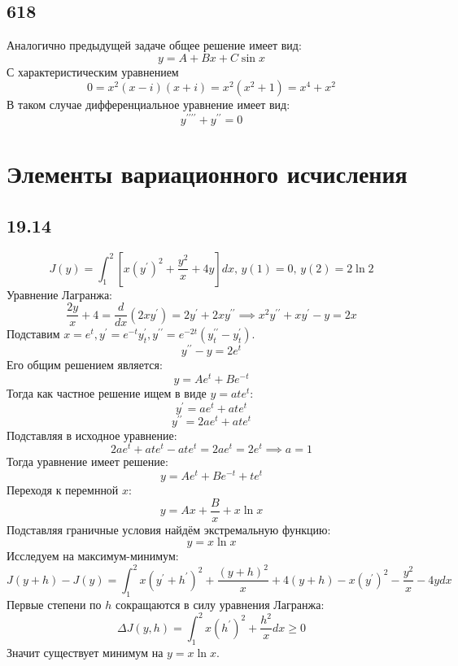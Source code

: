 \documentclass[12pt]{article}
\begin{document}
\subsection*{618}
Аналогично предыдущей задаче общее решение имеет вид: 
\[
    y = A + Bx + C \sin x
\]
С характеристическим уравнением 
\[
    0 = x^2 (x - i) (x + i) = x^2(x^2 + 1) = x^4 + x^2
\]
В таком случае дифференциальное уравнение имеет вид: 
\[
    y^{\prime\prime\prime\prime} + y^{\prime\prime} = 0
\]

\section{Элементы вариационного исчисления}
\subsection*{19.14}
\[
    J(y) = \int_{1}^{2} \left[ x(y^{\prime})^2 + \frac{y^2}{x} + 4y \right] dx, \, y(1) = 0, \, y(2) = 2\ln 2 
\]
Уравнение Лагранжа: 
\[
    \frac{2y}{x} + 4 = \frac{d}{dx} \left( 2x y^{\prime} \right) = 2y^{\prime} + 2x y^{\prime\prime} \implies x^2 y^{\prime\prime} + xy^{\prime} - y = 2x
\]
Подставим $x = e^t, y^{\prime} = e^{-t} y^{\prime}_t, y^{\prime\prime} = e^{-2t} (y^{\prime\prime}_t - y^{\prime}_t)$. 
\[
    y^{\prime\prime} - y = 2e^{t}
\]
Его общим решением является: 
\[
    y = A e^t + B e^{-t}
\]
Тогда как частное решение ищем в виде $y = at e^t$:
\[
    y^{\prime} = ae^t + at e^t 
\] 
\[
    y^{\prime\prime} = 2ae^t + at e^t
\]
Подставляя в исходное уравнение: 
\[
    2ae^t + at e^t - ate^t = 2ae^t = 2 e^t \implies a = 1
\]
Тогда уравнение имеет решение: 
\[
    y = A e^t + B e^{-t} + t e^t
\]
Переходя к перемнной $x$: 
\[
    y = Ax + \frac{B}{x} + x \ln x 
\] 
Подставляя граничные условия найдём экстремальную функцию: 
\[
    y = x \ln x
\]
Исследуем на максимум-минимум: 
\[
    J(y + h) - J(y) = 
    \int_{1}^{2} x (y^{\prime} + h^{\prime} )^2 + \frac{(y + h)^2}{x} + 4(y + h) - x(y^{\prime})^2 - \frac{y^2}{x} - 4y dx
\]
Первые степени по $h$ сокращаются в силу уравнения Лагранжа: 
\[
    \Delta J(y, h) = \int_{1}^{2} x (h^{\prime})^2 + \frac{h^2}{x} dx \geq 0
\] 
Значит существует минимум на $y = x \ln x$. 
\end{document}
